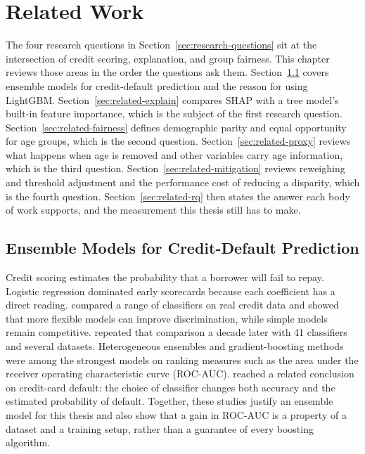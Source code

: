 
\chapter{Related Work}
\label{chap:related}

The four research questions in Section~\ref{sec:research-questions} sit at the intersection of credit scoring, explanation, and group fairness. This chapter reviews those areas in the order the questions ask them. Section~\ref{sec:related-ensembles} covers ensemble models for credit-default prediction and the reason for using LightGBM. Section~\ref{sec:related-explain} compares SHAP with a tree model's built-in feature importance, which is the subject of the first research question. Section~\ref{sec:related-fairness} defines demographic parity and equal opportunity for age groups, which is the second question. Section~\ref{sec:related-proxy} reviews what happens when age is removed and other variables carry age information, which is the third question. Section~\ref{sec:related-mitigation} reviews reweighing and threshold adjustment and the performance cost of reducing a disparity, which is the fourth question. Section~\ref{sec:related-rq} then states the answer each body of work supports, and the measurement this thesis still has to make.

\section{Ensemble Models for Credit-Default Prediction}
\label{sec:related-ensembles}

Credit scoring estimates the probability that a borrower will fail to repay. Logistic regression dominated early scorecards because each coefficient has a direct reading. \citet{baesens2003benchmark} compared a range of classifiers on real credit data and showed that more flexible models can improve discrimination, while simple models remain competitive. \citet{lessmann2015benchmark} repeated that comparison a decade later with 41 classifiers and several datasets. Heterogeneous ensembles and gradient-boosting methods were among the strongest models on ranking measures such as the area under the receiver operating characteristic curve (ROC-AUC). \citet{yeh2009default} reached a related conclusion on credit-card default: the choice of classifier changes both accuracy and the estimated probability of default. Together, these studies justify an ensemble model for this thesis and also show that a gain in ROC-AUC is a property of a dataset and a training setup, rather than a guarantee of every boosting algorithm.

